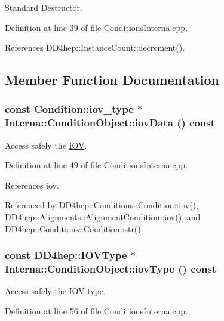 Standard Destructor. 

Definition at line 39 of file ConditionsInterna.cpp.

References DD4hep::InstanceCount::decrement().

\subsection{Member Function Documentation}
\hypertarget{class_d_d4hep_1_1_conditions_1_1_interna_1_1_condition_object_ad46d00d120ed754bb26569c814b4b650}{
\subsubsection[{iovData}]{\setlength{\rightskip}{0pt plus 5cm}const {\bf Condition::iov\_\-type} $\ast$ Interna::ConditionObject::iovData () const}}
\label{class_d_d4hep_1_1_conditions_1_1_interna_1_1_condition_object_ad46d00d120ed754bb26569c814b4b650}


Access safely the \hyperlink{class_d_d4hep_1_1_i_o_v}{IOV}. 

Definition at line 49 of file ConditionsInterna.cpp.

References iov.

Referenced by DD4hep::Conditions::Condition::iov(), DD4hep::Alignments::AlignmentCondition::iov(), and DD4hep::Conditions::Condition::str().\hypertarget{class_d_d4hep_1_1_conditions_1_1_interna_1_1_condition_object_a4eef0b466f4cbc67041a29ba9b650fa1}{
\subsubsection[{iovType}]{\setlength{\rightskip}{0pt plus 5cm}const {\bf DD4hep::IOVType} $\ast$ Interna::ConditionObject::iovType () const}}
\label{class_d_d4hep_1_1_conditions_1_1_interna_1_1_condition_object_a4eef0b466f4cbc67041a29ba9b650fa1}


Access safely the IOV-\/type. 

Definition at line 56 of file ConditionsInterna.cpp.

